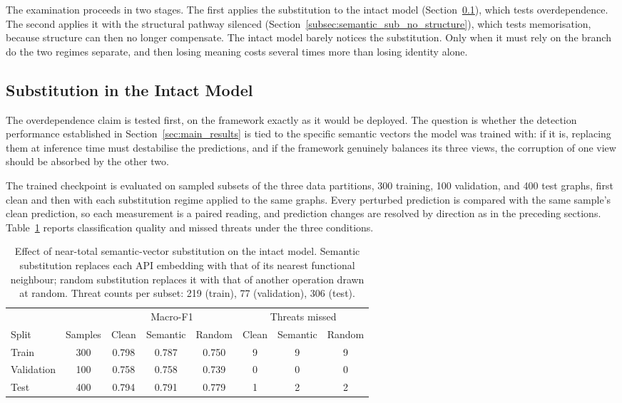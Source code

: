 \documentclass[%
    BCOR=10mm,
    DIV=13,
    toc=bibliography,
    toc=listof,
    oneside,
    12pt,
]{scrbook}
\begin{document}
The examination proceeds in two stages. The first applies the substitution to
the intact model (Section~\ref{subsec:semantic_sub_intact}), which tests
overdependence. The second applies it with the structural pathway silenced
(Section~\ref{subsec:semantic_sub_no_structure}), which tests memorisation,
because structure can then no longer compensate. The intact model barely
notices the substitution. Only when it must rely on the branch do the two
regimes separate, and then losing meaning costs several times more than losing
identity alone.

\subsection{Substitution in the Intact Model}
\label{subsec:semantic_sub_intact}

The overdependence claim is tested first, on the framework exactly as it
would be deployed. The question is whether the detection performance
established in Section~\ref{sec:main_results} is tied to the specific
semantic vectors the model was trained with: if it is, replacing them at
inference time must destabilise the predictions, and if the framework
genuinely balances its three views, the corruption of one view should be
absorbed by the other two.

The trained checkpoint is evaluated on sampled subsets of the three data
partitions, 300 training, 100 validation, and 400 test graphs, first clean
and then with each substitution regime applied to the same graphs. Every
perturbed prediction is compared with the same sample's clean prediction, so
each measurement is a paired reading, and prediction changes are resolved by
direction as in the preceding sections.
Table~\ref{tab:semantic_sub_intact} reports classification quality and
missed threats under the three conditions.

\begin{table}[htbp]
\centering
\caption[Semantic-vector substitution in the intact model]{Effect of
near-total semantic-vector substitution on the intact model. Semantic
substitution replaces each API embedding with that of its nearest functional
neighbour; random substitution replaces it with that of another operation
drawn at random. Threat counts per subset: 219 (train), 77 (validation), 306
(test).}
\label{tab:semantic_sub_intact}
\small
\begin{tabular}{l c c c c c c c}
\toprule
& & \multicolumn{3}{c}{Macro-F1} & \multicolumn{3}{c}{Threats missed} \\
\cmidrule(lr){3-5} \cmidrule(lr){6-8}
Split & Samples & Clean & Semantic & Random & Clean & Semantic & Random \\
\midrule
Train      & 300 & 0.798 & 0.787 & 0.750 & 9 & 9 & 9 \\
Validation & 100 & 0.758 & 0.758 & 0.739 & 0 & 0 & 0 \\
Test       & 400 & 0.794 & 0.791 & 0.779 & 1 & 2 & 2 \\
\bottomrule
\end{tabular}
\end{table}
\end{document}
